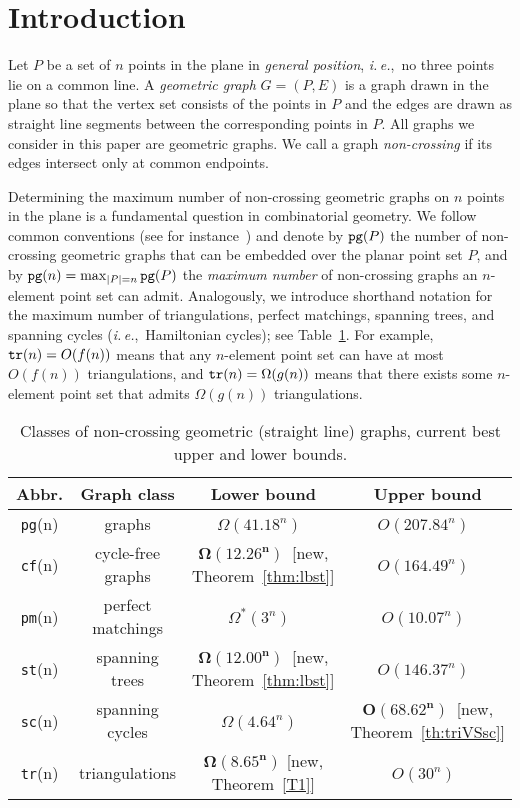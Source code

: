 \documentclass[11pt]{article}
\def\ie{{\it i.\,e.},~}
\def\tr{{\tt tr}}
\def\sc{{\tt sc}}
\def\st{{\tt st}}
\def\cf{{\tt cf}}
\def\pm{{\tt pm}}
\def\pg{{\tt pg}}
\begin{document}
\section{Introduction}

Let $P$ be a set of $n$ points in the plane in {\em general position},
\ie no three points lie on a common line.
A {\em geometric graph} $G=(P,E)$ is a graph drawn in the plane so
that the vertex set consists of the points in $P$ and the edges
are drawn as straight line segments between the corresponding points in $P$.
All graphs we consider in this paper are geometric graphs. We call a
 graph \emph{non-crossing} if its edges intersect only at common endpoints.

Determining the maximum number of non-crossing geometric graphs on $n$
points in the plane is a fundamental question in combinatorial geometry.
We follow common conventions (see for instance~\cite{SW06})
and denote by $\pg(P)$ the number of non-crossing
geometric graphs that can be embedded over the planar point set $P$, and by $\pg(n)=\max_{|P|=n} \pg(P)$ the {\em maximum number}
of non-crossing graphs an $n$-element point set can admit.
Analogously, we introduce shorthand notation for the maximum number of
triangulations, perfect matchings, spanning trees, and spanning cycles
(\ie Hamiltonian cycles); see Table~\ref{table1}.
For example, $\tr(n)= O(f(n))$ means that any $n$-element point set
can have at most $O(f(n))$ triangulations, and $\tr(n)=\Omega(g(n))$
means that there exists some $n$-element point set that admits $\Omega(g(n))$
triangulations.

\begin{table}[h]
\begin{center}
\begin{tabular}{|c|c|c|c|}
\hline
{\textbf {Abbr.}} & {\textbf {Graph class}} & {\textbf {Lower bound}}
& {\textbf {Upper bound}} \\
\hline\hline
\pg(n) & graphs &
$\Omega(41.18^n)$~\cite{AHV+06,GNT00} & $O(207.84^n)$~\cite{HSSTW11,SS10}\\
\hline
\cf(n) & cycle-free graphs & $\mathbf{\Omega(12.26^n)}$~[new, Theorem~\ref{thm:lbst}] & $O(164.49^n)$~\cite{HSSTW11,SS10}\\
\hline
\pm(n) & perfect matchings & $\Omega^*(3^n)$~\cite{GNT00} & $O(10.07^n)$~\cite{SW06} \\
\hline
\st(n) & spanning trees & $\mathbf{\Omega(12.00^n)}$~[new, Theorem~\ref{thm:lbst}] & $O(146.37^n)$~\cite{HSSTW11,SS10} \\
\hline	
\sc(n) & spanning cycles & $\Omega(4.64^n)$~\cite{GNT00} & $\mathbf{O(68.62^n)}$~[new, Theorem~\ref{th:triVSsc}]\\
\hline
\tr(n) & triangulations & $\mathbf{\Omega(8.65^n)}$ [new, Theorem~\ref{T1}]& $O(30^n)$~\cite{SS10} \\
\hline
\end{tabular}
\caption{Classes of non-crossing geometric (straight line) graphs, current best
  upper and lower bounds.\label{table1}}
\end{center}
\vspace{-\baselineskip}
\end{table}
\end{document}
